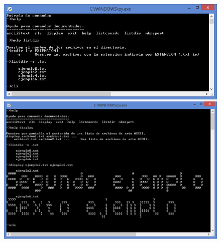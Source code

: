 \documentclass[a4paper,12pt]{article}
\begin{document}
\begin{figure}[htbp]
    \centering
    \begin{adjustbox}{max width=\textwidth, center}
        \includegraphics{C4/S1_C4.PNG}
    \end{adjustbox}
    \begin{adjustbox}{max width=\textwidth, center}
        \includegraphics{C4/S2_C4.PNG}
    \end{adjustbox}
\end{figure}
\end{document}

